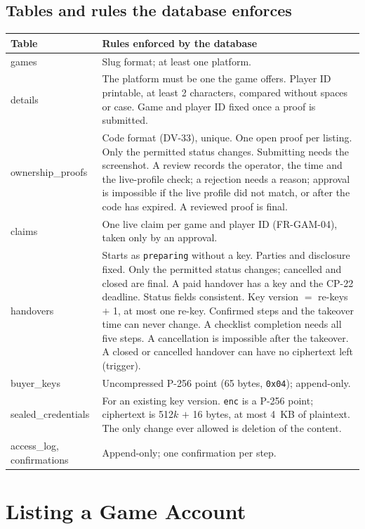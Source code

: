 \documentclass[11pt,a4paper]{article}
\newenvironment{dtable}[1]{\small\begin{longtable}{#1}}{\end{longtable}}
\begin{document}
\subsection{Tables and rules the database enforces}
\begin{dtable}{@{}>{\ttfamily\raggedright\arraybackslash}p{3.5cm}>{\raggedright\arraybackslash}p{11.7cm}@{}}
\toprule
\textnormal{\textbf{Table}} & \textbf{Rules enforced by the database} \\ \midrule \endhead
games & Slug format; at least one platform. \\
details & The platform must be one the game offers. Player ID printable, at least 2 characters, compared without spaces or case. Game and player ID fixed once a proof is submitted. \\
ownership\_proofs & Code format (DV-33), unique. One open proof per listing. Only the permitted status changes. Submitting needs the screenshot. A review records the operator, the time and the live-profile check; a rejection needs a reason; approval is impossible if the live profile did not match, or after the code has expired. A reviewed proof is final. \\
claims & One live claim per game and player ID (FR-GAM-04), taken only by an approval. \\
handovers & Starts as \texttt{preparing} without a key. Parties and disclosure fixed. Only the permitted status changes; cancelled and closed are final. A paid handover has a key and the CP-22 deadline. Status fields consistent. Key version $=$ re-keys $+$ 1, at most one re-key. Confirmed steps and the takeover time can never change. A checklist completion needs all five steps. A cancellation is impossible after the takeover. A closed or cancelled handover can have no ciphertext left (trigger). \\
buyer\_keys & Uncompressed P-256 point (65 bytes, \texttt{0x04}); append-only. \\
sealed\_credentials & For an existing key version. \texttt{enc} is a P-256 point; ciphertext is 512$k$ $+$ 16 bytes, at most 4~KB of plaintext. The only change ever allowed is deletion of the content. \\
access\_log, confirmations & Append-only; one confirmation per step. \\
\bottomrule
\end{dtable}

\section{Listing a Game Account}
\label{sec:listing}
\end{document}
